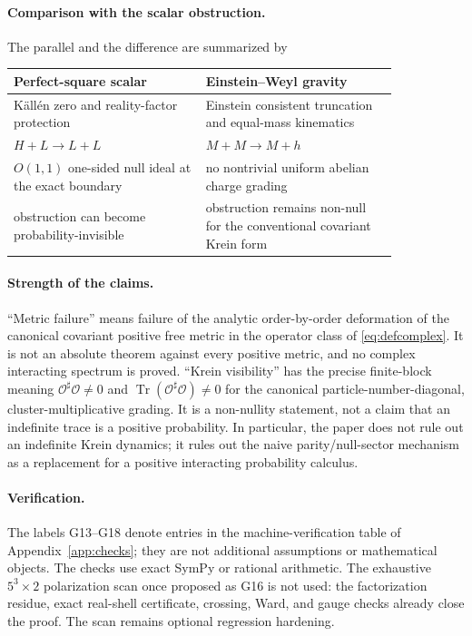 \documentclass[11pt]{article}
\theoremstyle{definition}
\theoremstyle{remark}
\newcommand{\Tr}{\operatorname{Tr}}
\begin{document}
\paragraph{Comparison with the scalar obstruction.}
The parallel and the difference are summarized by
\begin{center}
\begin{tabular}{p{0.42\linewidth}|p{0.42\linewidth}}
\hline
Perfect-square scalar & Einstein--Weyl gravity\\
\hline
K\"all\'en zero and reality-factor protection & Einstein consistent
truncation and equal-mass kinematics\\
$H+L\to L+L$ & $M+M\to M+h$\\
$O(1,1)$ one-sided null ideal at the exact boundary & no nontrivial
uniform abelian charge grading\\
obstruction can become probability-invisible & obstruction remains
non-null for the conventional covariant Krein form\\
\hline
\end{tabular}
\end{center}

\paragraph{Strength of the claims.}
``Metric failure'' means failure of the analytic order-by-order
deformation of the canonical covariant positive free metric in the
operator class of \eqref{eq:defcomplex}.  It is not an absolute theorem
against every positive metric, and no complex interacting spectrum is
proved.  ``Krein visibility'' has the precise finite-block meaning
$\mathcal O^\sharp\mathcal O\ne0$ and
$\Tr(\mathcal O^\sharp\mathcal O)\ne0$ for the canonical
particle-number-diagonal, cluster-multiplicative grading.  It is a
non-nullity statement,
not a claim that an indefinite trace is a positive probability.  In
particular, the paper does not rule out an indefinite Krein dynamics;
it rules out the naive parity/null-sector mechanism as a replacement for
a positive interacting probability calculus.

\paragraph{Verification.}
The labels G13--G18 denote entries in the machine-verification table of
Appendix~\ref{app:checks}; they are not additional assumptions or
mathematical objects.  The checks use exact SymPy or rational arithmetic.
The exhaustive $5^3\times2$ polarization scan once proposed as G16 is
not used:
the factorization residue, exact real-shell certificate, crossing, Ward,
and gauge checks already close the proof.  The scan remains optional
regression hardening.
\end{document}
